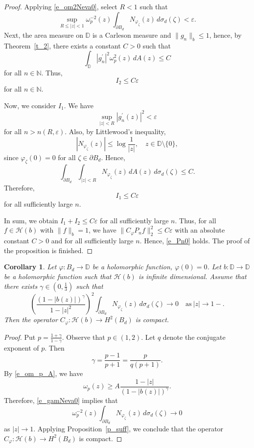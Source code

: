 \documentclass{amsart}
\numberwithin{equation}{section}
\newtheorem{corollary}[theorem]{Corollary}
\theoremstyle{definition}
\newcommand{\bd}{{B_d}}
\newcommand{\meal}{\sigma_d}
\newcommand{\dbr}{\mathcal{H}}
\newcommand{\er}{\varepsilon}
\newcommand{\za}{\zeta}
\newcommand{\ph}{\varphi}
\newcommand{\cph}{C_\varphi}
\newcommand{\om}{\omega}
\newcommand{\Dbb}{\mathbb D}
\newcommand{\Nbb}{\mathbb N}
\newcommand{\spd}{\partial B_d}
\begin{document}
\begin{proof}
Applying \eqref{e_om2Neva0}, select $R<1$ such that
\[
\sup_{R\le |z|< 1} \om_p^{-2}(z) \int_{\spd} N_{\ph_\za}(z)\, d\meal(\za) < \er.
\]
Next, the area measure on $\Dbb$ is a Carleson measure and $\|g_n\|_b \le 1$,
hence, by Theorem~\ref{t_2}, there exists a constant $C>0$ such that
\begin{equation}\label{e_Carle}
\int_{\Dbb} |g_n^\prime|^2 \om_p^2(z)\, dA(z) \le C
\end{equation}
for all $n\in \Nbb$. Thus,
\[
I_2 \le C\er
\]
for all $n\in \Nbb$.

Now, we consider $I_1$. We have
\[
\sup_{|z|<R} |g_n^\prime(z)|^2  < \er
\]
for all $n> n(R, \er)$. 
Also, by Littlewood's inequality,
\[
|N_{\ph_\za}(z)| \le \log\frac{1}{|z|}, \quad z\in\Dbb\setminus \{0\},
\]
since $\ph_\za(0)=0$ for all $\za\in\spd$.
Hence,
\[
\int_{\spd} \int_{|z|<R} N_{\ph_\za}(z)\, dA(z)\, d\meal(\za) \le C.
\]
Therefore,
\[
I_1 \le C\er
\]
for all sufficiently large $n$.

In sum, we obtain $I_1 + I_2 \le C \er$ for all sufficiently large $n$.
Thus, for all $f\in\dbr(b)$ with $\|f\|_b =1$, we have $\|\cph P_n f\|_2^2 \le C\er$ 
with an absolute constant $C>0$ and for all sufficiently large $n$.
Hence, \eqref{e_Pn0} holds. The proof of the proposition is finished.
\end{proof}

\begin{corollary}\label{c_suff}
Let $\ph: \bd \to \Dbb$ be a holomorphic function, $\ph(0)=0$.
Let $b:\Dbb \to \Dbb$ be a holomorphic function such that $\dbr(b)$ is infinite dimensional.
Assume that there exists $\gamma\in (0, \frac{1}{3})$ such that
\begin{equation}\label{e_gamNeva0}
\left(\frac{(1-|b(z)|)^\gamma}{1-|z|^2} \right)^2 \int_{\spd} N_{\ph_\za} (z)\, d\meal(\za) 
\to 0\quad \textrm{as}\ |z|\to 1-.
\end{equation}
Then the operator $\cph: \dbr(b) \to H^2(\bd)$ is compact.
\end{corollary}
\begin{proof}
Put $p = \frac{1+\gamma}{1-\gamma}$. Observe that $p\in (1,2)$.
Let $q$ denote the conjugate exponent of $p$.
Then
\[
\gamma = \frac{p-1}{p+1} = \frac{p}{q(p+1)}.
\]
By \eqref{e_om_p_A}, we have
\[
\om_p (z) \ge A\frac{1-|z|}{(1-|b(z)|)^\gamma}.
\]
Therefore, \eqref{e_gamNeva0} implies that
\[
\om_p^{-2}(z) \int_{\spd} N_{\ph_\za}(z)\, d\meal(\za) \to 0
\]
as $|z|\to 1$. Applying Proposition~\ref{p_suff}, we conclude that the operator
$\cph: \dbr(b) \to H^2(\bd)$ is compact.
\end{proof}
\end{document}
